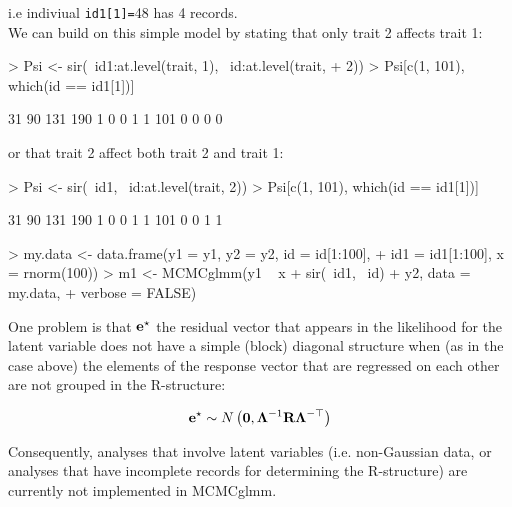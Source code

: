 \documentclass{article}
\begin{document}
i.e indiviual  \texttt{id1[1]=}48 has 4 records.\\

We can build on this simple model by stating that only trait 2 affects trait 1:

\begin{Schunk}
\begin{Sinput}
> Psi <- sir(~id1:at.level(trait, 1), ~id:at.level(trait, 
+     2))
> Psi[c(1, 101), which(id == id1[1])]
\end{Sinput}
\begin{Soutput}
    31 90 131 190
1    0  0   1   1
101  0  0   0   0
\end{Soutput}
\end{Schunk}

or that trait 2 affect both trait 2 and trait 1:

\begin{Schunk}
\begin{Sinput}
> Psi <- sir(~id1, ~id:at.level(trait, 2))
> Psi[c(1, 101), which(id == id1[1])]
\end{Sinput}
\begin{Soutput}
    31 90 131 190
1    0  0   1   1
101  0  0   1   1
\end{Soutput}
\end{Schunk}


\begin{Schunk}
\begin{Sinput}
> my.data <- data.frame(y1 = y1, y2 = y2, id = id[1:100], 
+     id1 = id1[1:100], x = rnorm(100))
> m1 <- MCMCglmm(y1 ~ x + sir(~id1, ~id) + y2, data = my.data, 
+     verbose = FALSE)
\end{Sinput}
\end{Schunk}

One problem is that ${\bf e}^{\star}$ the residual vector that appears in the likelihood for the latent variable does not have a simple (block) diagonal structure when (as in the case above) the elements of the response vector that are regressed on each other are not grouped in the R-structure:

\begin{equation}
{\bf e}^{\star} \sim N\left({\bm 0}, {\bm \Lambda}^{-1}{\bf R}{\bm \Lambda}^{-\top}\right)
\end{equation}

Consequently, analyses that involve latent variables (i.e. non-Gaussian data, or analyses that have incomplete records for determining the R-structure) are currently not implemented in MCMCglmm.
\end{document}
